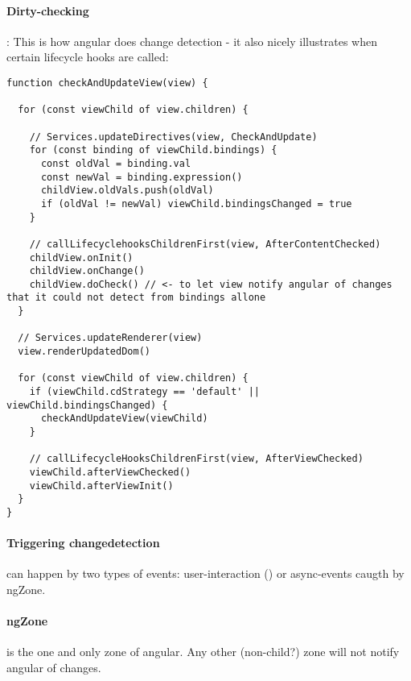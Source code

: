 \paragraph{Dirty-checking}: This is how angular does change detection - it also nicely illustrates when certain lifecycle hooks are called:
\begin{lstlisting}
function checkAndUpdateView(view) {

  for (const viewChild of view.children) {
    
    // Services.updateDirectives(view, CheckAndUpdate)
    for (const binding of viewChild.bindings) {
      const oldVal = binding.val
      const newVal = binding.expression()
      childView.oldVals.push(oldVal)
      if (oldVal != newVal) viewChild.bindingsChanged = true
    }
    
    // callLifecyclehooksChildrenFirst(view, AfterContentChecked)
    childView.onInit()
    childView.onChange()
    childView.doCheck() // <- to let view notify angular of changes that it could not detect from bindings allone
  }

  // Services.updateRenderer(view)
  view.renderUpdatedDom()

  for (const viewChild of view.children) {
    if (viewChild.cdStrategy == 'default' || viewChild.bindingsChanged) {
      checkAndUpdateView(viewChild)
    }

    // callLifecycleHooksChildrenFirst(view, AfterViewChecked)
    viewChild.afterViewChecked()
    viewChild.afterViewInit()
  }
}
\end{lstlisting}

\paragraph{Triggering changedetection} can happen by two types of events: user-interaction () or async-events caugth by ngZone.

\paragraph{ngZone} is the one and only zone of angular. Any other (non-child?) zone will not notify angular of changes. 